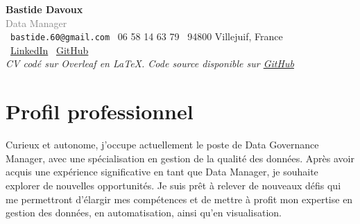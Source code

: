 \documentclass[a4paper,10pt]{article}
\begin{document}
\begin{center}
    {\Huge \textbf{Bastide Davoux}} \\
    \vspace{0.2cm}
    \textcolor{gray}{Data Manager} \\
    \vspace{0.2cm}
    \vspace{0.5cm}
    \faEnvelope \, \texttt{bastide.60@gmail.com} \quad
    \faPhone \, 06 58 14 63 79 \quad
    \faHome \, 94800 Villejuif, France \\
    \vspace{0.2cm}
    \faLinkedinSquare \, \href{https://www.linkedin.com/in/bastide-davoux-74a17a1b9/}{LinkedIn} \quad
    \faGithub \, \href{https://github.com/bdavoux/Projets}{GitHub} \\
    \vspace{0.5cm}
  \textit{CV codé sur Overleaf en LaTeX. Code source disponible sur \href{https://github.com/bdavoux/Projets}{GitHub}}

    \vspace{0.5cm}
\end{center}

\section*{Profil professionnel}
\begin{minipage}{0.6\textwidth} %
    Curieux et autonome, j'occupe actuellement le poste de Data Governance Manager, avec une spécialisation en gestion de la qualité des données. Après avoir acquis une expérience significative en tant que Data Manager, je souhaite explorer de nouvelles opportunités. Je suis prêt à relever de nouveaux défis qui me permettront d'élargir mes compétences et de mettre à profit mon expertise en gestion des données, en automatisation, ainsi qu'en visualisation.
\end{minipage}%
\hfill
\begin{minipage}{0.35\textwidth} %
    \begin{center}
    \end{center}
\end{minipage}
\end{document}
